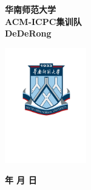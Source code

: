 \documentclass[9pt,landscape]{article}
\begin{document}
\thispagestyle{empty}
\null\vfill
\begin{center}
\Huge \textbf{华南师范大学 \\ACM-ICPC集训队 \\DeDeRong}

\vspace{1.5cm}

\includegraphics[height=5cm]{logo.pdf}

\date{\today}{\textbf{\number\year 年 \number\month 月 \number\day 日}}
\end{center}
\vfill
\clearpage

\begin{twocolumn}
\tableofcontents
\end{twocolumn}

\newpage
\columnseprule=0.05pt
\begin{twocolumn}

\end{twocolumn}
\end{document}
